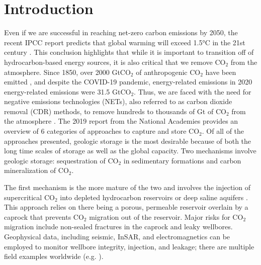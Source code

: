 \documentclass[
    paper,
  ]{geophysics}
\begin{document}
\section{Introduction}
Even if we are successful in reaching net-zero carbon emissions by 2050, the recent IPCC report predicts that global warming will exceed 1.5°C in the 21st century \citep{IPCC2021}. This conclusion highlights that while it is important to transition off of hydrocarbon-based energy sources, it is also critical that we remove CO$_2$ from the atmosphere. Since 1850, over 2000 GtCO$_2$ of anthropogenic CO$_2$ have been emitted \citep{IEA2021}, and despite the COVID-19 pandemic, energy-related emissions in 2020 energy-related emissions were 31.5 GtCO$_2$. Thus, we are faced with the need for negative emissions technologies (NETs),  also referred to as carbon dioxide removal (CDR) methods, to remove hundreds to thousands of Gt of CO$_2$ from the atmosphere \citep{IPCC2021, NationalAcademies2019}. The 2019 report from the National Academies \citep{NationalAcademies2019} provides an overview of 6 categories of approaches to capture and store CO$_2$. Of all of the approaches presented, geologic storage is the most desirable because of both the long time scales of storage as well as the global capacity. Two mechanisms involve geologic storage: sequestration of CO$_2$ in sedimentary formations and carbon mineralization of CO$_2$.

The first mechanism is the more mature of the two and involves the injection of supercritical CO$_2$ into depleted hydrocarbon reservoirs or deep saline aquifers \citep{NationalAcademies2019, Kelemen2019}. This approach relies on there being a porous, permeable reservoir overlain by a caprock that prevents CO$_2$ migration out of the reservoir. Major risks for CO$_2$ migration include non-sealed fractures in the caprock and leaky wellbores. Geophysical data, including seismic, InSAR, and electromagnetics can be employed to monitor wellbore integrity, injection, and leakage; there are multiple field examples worldwide (e.g. \cite{Vasco2010, Ajo-Franklin2013, Heagy2019, Wilt2020}).
\end{document}
